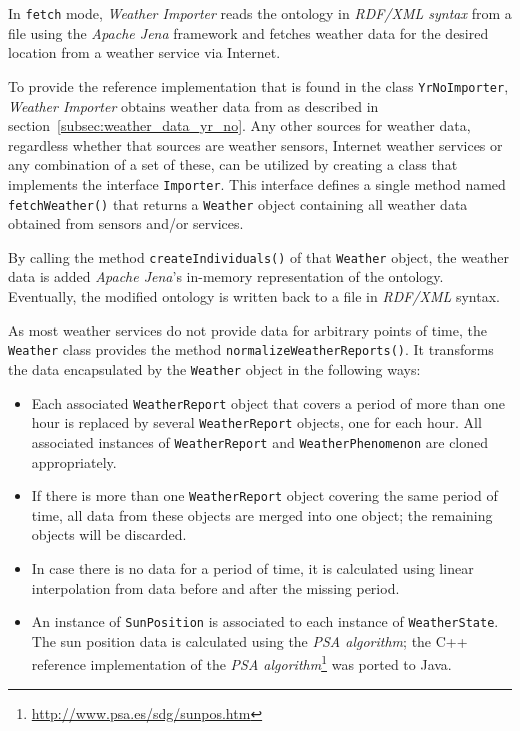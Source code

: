 In \texttt{fetch} mode, \emph{Weather Importer} reads the \thinkhomeweather ontology in \emph{RDF/XML syntax} from a file using the \emph{Apache Jena} framework and fetches weather data for the desired location from a weather service via Internet.

To provide the reference implementation that is found in the class \texttt{YrNoImporter}, \emph{Weather Importer} obtains weather data from \yrno as described in section~\ref{subsec:weather_data_yr_no}. Any other sources for weather data, regardless whether that sources are weather sensors, Internet weather services or any combination of a set of these, can be utilized by creating a class that implements the interface \texttt{Importer}. This interface defines a single method named \texttt{fetchWeather()} that returns a \texttt{Weather} object containing all weather data obtained from sensors and/or services.

By calling the method \texttt{createIndividuals()} of that \texttt{Weather} object, the weather data is added \emph{Apache Jena}'s in-memory representation of the ontology. Eventually, the modified ontology is written back to a file in \emph{RDF/XML} syntax.

As most weather services do not provide data for arbitrary points of time, the \texttt{Weather} class provides the method \texttt{normalizeWeatherReports()}. It transforms the data encapsulated by the \texttt{Weather} object in the following ways:
\begin{itemize}
  \item Each associated \texttt{WeatherReport} object that covers a period of more than one hour is replaced by several \texttt{WeatherReport} objects, one for each hour. All associated instances of \texttt{WeatherReport} and \texttt{WeatherPhenomenon} are cloned appropriately.
  
  \item If there is more than one \texttt{WeatherReport} object covering the same period of time, all data from these objects are merged into one object; the remaining objects will be discarded.
  
  \item In case there is no data for a period of time, it is calculated using linear interpolation from data before and after the missing period\cite{maths}.
  
  \item An instance of \texttt{SunPosition} is associated to each instance of \texttt{WeatherState}. The sun position data is calculated using the \emph{PSA algorithm}\cite{PSA_algorithm}; the C++ reference implementation of the \emph{PSA algorithm}\footnote{\href{http://www.psa.es/sdg/sunpos.htm}{http://www.psa.es/sdg/sunpos.htm}} was ported to Java.
\end{itemize}

